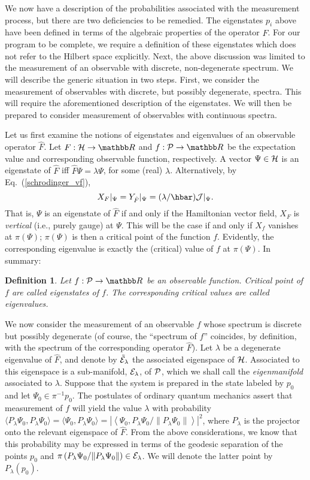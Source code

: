 \documentclass[12pt,aps,eqsecnum,tighten,nofootinbib]{revtex4-2}
\newtheorem{definition}{Definition}[section]
\def\be{\begin{equation}}
\def\ee{\end{equation}}
\def\<{\langle}
\def\>{\rangle}
\def\H{{\cal H}}
\def\P{{\cal P}}
\def\J{{\cal J}}
\newcommand{\eqn}[1]{Eq.~(\ref{#1})}
\newcommand{\hvf}[1]{{X_{#1}}}
\def\Bbb{}
\def\R{\mathbb R}
\begin{document}
We now have a description of the probabilities associated with the
measurement process, but there are two deficiencies to be remedied.
The eigenstates $p_i$ above have been defined in terms of the
algebraic properties of the operator $\hat{F}$.  For our program to be
complete, we require a definition of these eigenstates which does not
refer to the Hilbert space explicitly.  Next, the above discussion was
limited to the measurement of an observable with discrete,
non-degenerate spectrum.  We will describe the generic situation in
two steps.  First, we consider the measurement of observables with
discrete, but possibly degenerate, spectra.  This will require the
aforementioned description of the eigenstates.  We will then be
prepared to consider measurement of observables with continuous
spectra.

Let us first examine the notions of eigenstates and eigenvalues of an
observable operator $\hat{F}$. Let $F : \H \rightarrow \R$ and $f :
\P \rightarrow \R$ be the expectation value and corresponding
observable function, respectively.  A vector $\Psi\in\H$ is an
eigenstate of $\hat{F}$ iff $\hat{F}\Psi = \lambda \Psi$, for some
(real) $\lambda$.  Alternatively, by \eqn{schrodinger_vf},
%
\be
\hvf{F}|_\Psi = Y_{\hat{F}}|_\Psi = (\lambda / \hbar) \J|_\Psi.
\ee
%
That is, $\Psi$ is an eigenstate of $\hat{F}$ if and only if the
Hamiltonian vector field, $\hvf{F}$ is {\em vertical} (i.e., purely
gauge) at $\Psi$.  This will be the case if and only if $\hvf{f}$
vanishes at $\pi(\Psi)$;  $\pi(\Psi)$ is then a critical point of the
function $f$.  Evidently, the corresponding eigenvalue is exactly the
(critical) value of $f$ at $\pi(\Psi)$.  In summary:
%
\begin{definition}
Let $f:\P\rightarrow\R$ be an observable function.  Critical point of
$f$ are called {\em eigenstates} of $f$.  The corresponding critical
values are called {\em eigenvalues}.
\end{definition}

We now consider the measurement of an observable $f$ whose spectrum is
discrete but possibly degenerate (of course, the ``spectrum of $f$''
coincides, by definition, with the spectrum of the corresponding
operator $\hat{F}$).  Let $\lambda$ be a degenerate eigenvalue of
$\hat{F}$, and denote by $\tilde{\cal E}_\lambda$ the associated
eigenspace of $\H$.  Associated to this eigenspace is a sub-manifold,
${\cal E}_\lambda$, of $\P$, which we shall call the {\em
eigenmanifold} associated to $\lambda$.  Suppose that the system is
prepared in the state labeled by $p_0$ and let $\Psi_0 \in
\pi^{-1}p_0$.  The postulates of ordinary quantum mechanics assert
that measurement of $f$ will yield the value $\lambda$ with
probability $\< {\Bbb P}_\lambda \Psi_0, {\Bbb P}_\lambda \Psi_0 \> =
\< \Psi_0, {\Bbb P}_\lambda \Psi_0 \> = \left| \left< \Psi_0, {\Bbb
P}_\lambda \Psi_0 / \| {\Bbb P}_\lambda \Psi_0 \| \right> \right|^2$,
where ${\Bbb P}_\lambda$ is the projector onto the relevant eigenspace
of $\hat{F}$. {}From the above considerations, we know that this
probability may be expressed in terms of the geodesic separation of
the points $p_0$ and $\pi\left( {\Bbb P}_\lambda \Psi_0 / \| {\Bbb
P}_\lambda \Psi_0 \|\right) \in {\cal E}_\lambda$.  We will denote the
latter point by ${\Bbb P}_\lambda(p_0)$.
\end{document}
